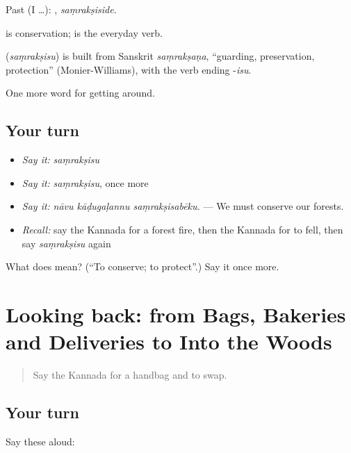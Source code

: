Past (I …): , \emph{saṃrakṣiside}.

 is conservation;  is the everyday verb.

\begin{cousinweb}
\textbf{} (\emph{saṃrakṣisu}) is built from Sanskrit \emph{saṃrakṣaṇa}, \textquotedblleft{}guarding, preservation, protection\textquotedblright{} (Monier-Williams), with the verb ending -\emph{isu}.
\end{cousinweb}

\begin{grammarlens}[title={What you've built}]
One more word for getting around.
\end{grammarlens}

\subsection*{Your turn}
\begin{itemize}
\raggedright
  \item \emph{Say it:} \emph{saṃrakṣisu}
  \item \emph{Say it:} \emph{saṃrakṣisu}, once more
  \item \emph{Say it:} \emph{nāvu kāḍugaḷannu saṃrakṣisabēku.} — We must conserve our forests.
  \item \emph{Recall:} say the Kannada for a forest fire, then the Kannada for to fell, then say \emph{saṃrakṣisu} again
\end{itemize}

\begin{tcolorbox}[breakable,colback=teal!4,colframe=teal!35!black,title={Before you move on}]
What does  mean? (\textquotedblleft{}To conserve; to protect\textquotedblright{}.) Say it once more.
\end{tcolorbox}
\section[(dialogue)]{Looking back: from Bags, Bakeries and Deliveries to Into the Woods}

\label{lesson:KA-R475-review-469-475}



\begin{quote}
Say the Kannada for a handbag and to swap.
\end{quote}

\subsection*{Your turn}
Say these aloud:

